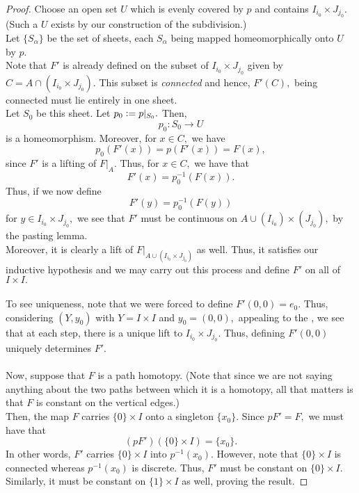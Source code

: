 \documentclass[12pt]{article}
\theoremstyle{definition}
\numberwithin{thm}{section}
\begin{document}
\begin{proof}
	Choose an open set $U$ which is evenly covered by $p$ and contains $I_{i_0} \times J_{j_0}.$ (Such a $U$ exists by our construction of the subdivision.)\\
	Let $\{S_\alpha\}$ be the set of sheets, each $S_\alpha$ being mapped homeomorphically onto $U$ by $p.$\\
	Note that $F'$ is already defined on the subset of $I_{i_0} \times J_{j_0}$ given by $C = A \cap (I_{i_0} \times J_{j_0}).$ This subset is \emph{connected} and hence, $F'(C),$ being connected must lie entirely in one sheet.\\
	Let $S_0$ be this sheet. Let $p_0 \vcentcolon= p|_{S_0}.$ Then,
	\begin{equation*} 
		p_0 : S_0 \to U
	\end{equation*}
	is a homeomorphism. Moreover, for $x \in C,$ we have
	\begin{equation*} 
		p_0(F'(x)) = p(F'(x)) = F(x),
	\end{equation*}
	since $F'$ is a lifting of $F|_A.$ Thus, for $x \in C,$ we have that
	\begin{equation*} 
		F'(x) = p_0^{-1}(F(x)).
	\end{equation*}
	Thus, if we now define
	\begin{equation*} 
		F'(y) = p_0^{-1}(F(y))
	\end{equation*}
	for $y \in I_{i_0} \times J_{j_0},$ we see that $F'$ must be continuous on $A \cup (I_{i_0}) \times (J_{j_0}),$ by the pasting lemma.\\
	Moreover, it is clearly a lift of $F|_{A \cup (I_{i_0} \times J_{j_0})}$ as well. Thus, it satisfies our inductive hypothesis and we may carry out this process and define $F'$ on all of $I \times I.$\\~\\
	To see uniqueness, note that we were forced to define $F'(0, 0) = e_0.$ Thus, considering $(Y, y_0)$ with $Y = I \times I$ and $y_0 = (0, 0),$ appealing to the , we see that at each step, there is a unique lift to $I_{i_0} \times J_{j_0}.$ Thus, defining $F'(0, 0)$ uniquely determines $F'.$\\~\\
	Now, suppose that $F$ is a path homotopy. (Note that since we are not saying anything about the two paths between which it is a homotopy, all that matters is that $F$ is constant on the vertical edges.)\\
	Then, the map $F$ carries $\{0\} \times I$ onto a singleton $\{x_0\}.$ Since $pF' = F,$ we must have that
	\begin{equation*} 
		(pF')(\{0\} \times I) = \{x_0\}.
	\end{equation*}
	In other words, $F'$ carries $\{0\} \times I$ into $p^{-1}(x_0).$ However, note that $\{0\} \times I$ is connected whereas $p^{-1}(x_0)$ is discrete. Thus, $F'$ must be constant on $\{0\} \times I.$\\
	Similarly, it must be constant on $\{1\} \times I$ as well, proving the result.
\end{proof}
\end{document}
